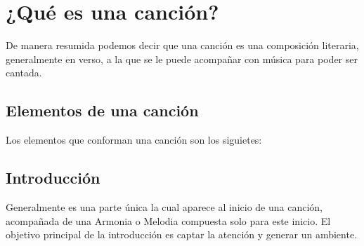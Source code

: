 \documentclass[12pt, a4paper, titlepage]{report}
\begin{document}
		  \newpage
	    \section{¿Qué es una canción?}
	    De manera resumida podemos decir que una canción es una composición literaria, generalmente en verso, a la que se le puede acompañar con música para poder ser cantada.\cite{refEstructuraCancion1}\par
			\subsection{Elementos de una canción}
			Los elementos que conforman una canción son los siguietes:
			\subsection{Introducción}
			Generalmente es una parte única la cual aparece al inicio de una canción, acompañada de una \Gls{Armonia} o \Gls{Melodia} compuesta solo para este inicio. El objetivo principal de la introducción es captar la atención y generar un ambiente.\cite{refEstructuraCancion2}\par
\end{document}
